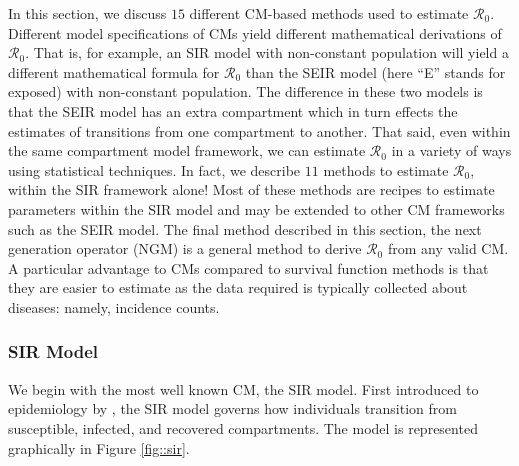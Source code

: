 \documentclass[12pt]{article}
\newcommand{\xxsir}{\ensuremath{11}} %
\newcommand{\rr}{\ensuremath{\mathcal{R}_0}}
\begin{document}
In this section, we discuss $15$ different CM-based methods used to estimate $\rr$.  Different model specifications of CMs yield different mathematical derivations of $\rr$.  That is, for example, an SIR model with non-constant population will yield a different mathematical formula for $\rr$ than the SEIR model (here ``E'' stands for exposed) with non-constant population.  The difference in these two models is that the SEIR model has an extra compartment which in turn effects the estimates of transitions from one compartment to another.  That said, even within the same compartment model framework, we can estimate $\rr$ in a variety of ways using statistical techniques.  In fact, we describe $\xxsir$ methods to estimate $\rr$, within the SIR framework alone!  Most of these methods are recipes to estimate parameters within the SIR model and may be extended to other CM frameworks such as the SEIR model.  The final method described in this section, the next generation operator (NGM) is a general method to derive $\rr$ from any valid CM.  A particular advantage to CMs compared to survival function methods is that they are easier to estimate as the data required is typically collected about diseases: namely, incidence counts.  




\subsubsection{SIR Model}
\label{sec:sir-model}

We begin with the most well known CM, the SIR model.   First introduced to epidemiology by  \cite{Kermack700}, the SIR model governs how individuals transition from susceptible, infected, and recovered compartments.  The model is represented graphically in Figure \ref{fig::sir}. 
\end{document}
